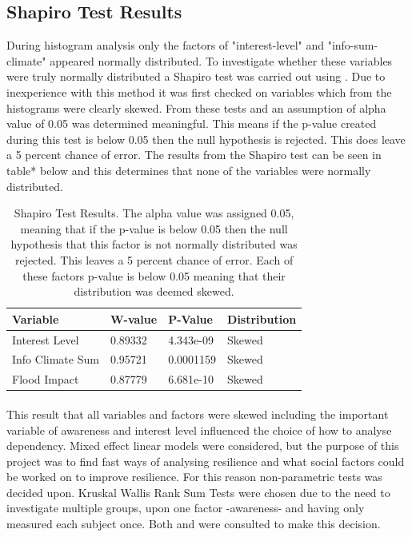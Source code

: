 \subsection{Shapiro Test Results}

During histogram analysis only the factors of "interest-level" and "info-sum-climate" appeared normally distributed. To investigate whether these variables were truly normally distributed a Shapiro test was carried out using \cite{royston_extension_1982} . Due to inexperience with this method it was first checked on variables which from the histograms were clearly skewed. From these tests and \cite{royston_extension_1982} an assumption of alpha value of 0.05 was determined meaningful. This means if the p-value created during this test is below 0.05 then the null hypothesis is rejected. This does leave a 5 percent chance of error. The results from the Shapiro test can be seen in table* below and this determines that none of the variables were normally distributed. 

\begin{table}[h]
    \centering
    \begin{tabular}{|l|l|l|l|}
    \hline
         Variable & W-value & P-Value & Distribution \\ \hline
       Interest Level & 0.89332 & 4.343e-09 & Skewed \\ \hline
         Info Climate Sum  & 0.95721 & 0.0001159 & Skewed \\ \hline
        Flood Impact & 0.87779 & 6.681e-10 & Skewed \\ \hline
     \end{tabular}
    \caption{Shapiro Test Results. The alpha value was assigned 0.05, meaning that if the p-value is below 0.05 then the null hypothesis that this factor is not normally distributed was rejected. This leaves a 5 percent chance of error. Each of these factors p-value is below 0.05 meaning that their distribution was deemed skewed.}
    \label{table:shapiro_test_results}
\end{table}
\paragraph{}

This result that all variables and factors were skewed including the important variable of awareness and interest level influenced the choice of how to analyse dependency. Mixed effect linear models were considered, but the purpose of this project was to find fast ways of analysing resilience and what social factors could be worked on to improve resilience. For this reason non-parametric tests was decided upon. Kruskal Wallis Rank Sum Tests were chosen due to the need to investigate multiple groups, upon one factor -awareness- and having only measured each subject once. Both \cite{tasman_how_2014} and \cite{hollander_nonparametric_2014} were consulted to make this decision. 

